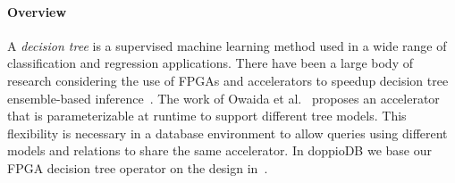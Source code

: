 \documentclass[11pt,dvipdfm]{article}
\begin{document}
\paragraph{\textbf{Overview}}
A \emph{decision tree} is a supervised machine learning method used in a wide range of classification and regression applications. %
There have been a large body of research considering the use of FPGAs and accelerators to speedup decision tree ensemble-based inference~\cite{owaidafpl2017, owaidafpl2018,ObergFPL12,essenfccm12,yun2014}. The work of Owaida et al.~\cite{owaidafpl2017,owaidafpl2018} proposes an accelerator that is parameterizable at runtime to support different tree models. This flexibility is necessary in a database environment to allow queries using different models and relations to share the same accelerator. In doppioDB we base our FPGA decision tree operator on the design in~\cite{owaidafpl2017}.
\end{document}
